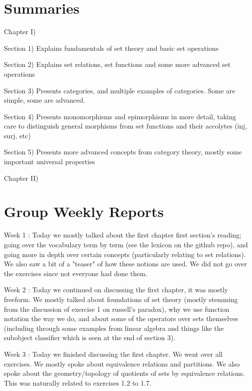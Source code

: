 \part{Summaries}

Chapter I)

Section 1) Explains fundamentals of set theory and basic set operations

Section 2) Explains set relations, set functions and some more advanced set operations

Section 3) Presents categories, and multiple examples of categories. Some are simple, some are advanced.

Section 4) Presents monomorphisms and epimorphisms in more detail, taking care to distinguish general morphisms from set functions and their accolytes (inj, surj, etc)

Section 5) Presents more advanced concepts from category theory, mostly some important universal properties


Chapter II)



\newpage


\part{Group Weekly Reports}

Week 1 : Today we mostly talked about the first chapter first section's reading; going over the vocabulary term by term (see the lexicon on the github repo), and going more in depth over certain concepts (particularly relating to set relations). We also saw a bit of a "teaser" of how these notions are used. We did not go over the exercises since not everyone had done them.

Week 2 : Today we continued on discussing the first chapter, it was mostly freeform. We mostly talked about foundations of set theory (mostly stemming from the discussion of exercise 1 on russell's paradox), why we use function notation the way we do, and about some of the operators over sets themselves (including through some examples from linear algebra and things like the subobject classifier which is seen at the end of section 3). 

Week 3 : Today we finished discussing the first chapter. We went over all exercises. We mostly spoke about equivalence relations and partitions. We also spoke about the geometry/topology of quotients of sets by equivalence relations. This was naturally related to exercises 1.2 to 1.7.

